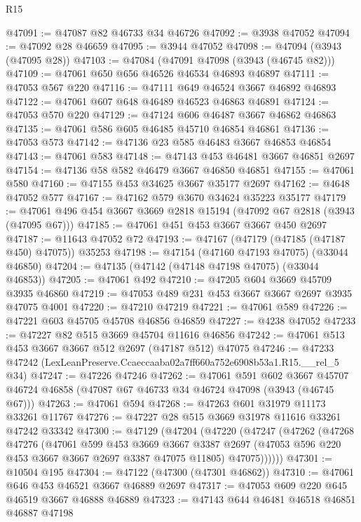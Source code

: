\begin{lexlean}{R15}
\begin{coremodule}
@47091 := @47087 @82 @46733 @34 @46726
@47092 := @3938 @47052
@47094 := @47092 @28 @46659
@47095 := @3944 @47052
@47098 := @47094 (@3943 (@47095 @28))
@47103 := @47084 (@47091 @47098 (@3943 (@46745 @82)))
@47109 := @47061 @650 @656 @46526 @46534 @46893 @46897
@47111 := @47053 @567 @220
@47116 := @47111 @649 @46524 @3667 @46892 @46893
@47122 := @47061 @607 @648 @46489 @46523 @46863 @46891
@47124 := @47053 @570 @220
@47129 := @47124 @606 @46487 @3667 @46862 @46863
@47135 := @47061 @586 @605 @46485 @45710 @46854 @46861
@47136 := @47053 @573
@47142 := @47136 @23 @585 @46483 @3667 @46853 @46854
@47143 := @47061 @583
@47148 := @47143 @453 @46481 @3667 @46851 @2697
@47154 := @47136 @58 @582 @46479 @3667 @46850 @46851
@47155 := @47061 @580
@47160 := @47155 @453 @34625 @3667 @35177 @2697
@47162 := @4648 @47052 @577
@47167 := @47162 @579 @3670 @34624 @35223 @35177
@47179 := @47061 @496 @454 @3667 @3669 @2818 @15194 (@47092 @67 @2818 (@3943 (@47095 @67)))
@47185 := @47061 @451 @453 @3667 @3667 @450 @2697
@47187 := @11643 @47052 @72
@47193 := @47167 (@47179 (@47185 (@47187 @450) @47075)) @35253
@47198 := @47154 (@47160 @47193 @47075) (@33044 @46850)
@47204 := @47135 (@47142 (@47148 @47198 @47075) (@33044 @46853))
@47205 := @47061 @492
@47210 := @47205 @604 @3669 @45709 @3935 @46860
@47219 := @47053 @489 @231 @453 @3667 @3667 @2697 @3935 @47075 @4001
@47220 := @47210 @47219
@47221 := @47061 @589
@47226 := @47221 @603 @45705 @45708 @46856 @46859
@47227 := @4238 @47052
@47233 := @47227 @82 @515 @3669 @45704 @11616 @46856
@47242 := @47061 @513 @453 @3667 @3667 @512 @2697 (@47187 @512) @47075
@47246 := @47233 @47242 (LexLeanPreserve.Ccaeccaaba02a7ff660a752e6908b53a1.R15.__rel_5 @34)
@47247 := @47226 @47246
@47262 := @47061
    @591
    @602
    @3667
    @45707
    @46724
    @46858
    (@47087 @67 @46733 @34 @46724 @47098 (@3943 (@46745 @67)))
@47263 := @47061 @594
@47268 := @47263 @601 @31979 @11173 @33261 @11767
@47276 := @47227 @28 @515 @3669 @31978 @11616 @33261 @47242 @33342
@47300 := @47129
    (@47204
      (@47220
        (@47247
          (@47262
            (@47268
              @47276
              (@47061
                @599
                @453
                @3669
                @3667
                @3387
                @2697
                (@47053 @596 @220 @453 @3667 @3667 @2697 @3387 @47075 @11805)
                @47075))))))
@47301 := @10504 @195
@47304 := @47122 (@47300 (@47301 @46862))
@47310 := @47061 @646 @453 @46521 @3667 @46889 @2697
@47317 := @47053 @609 @220 @645 @46519 @3667 @46888 @46889
@47323 := @47143 @644 @46481 @46518 @46851 @46887 @47198

\end{coremodule}
\end{lexlean}
